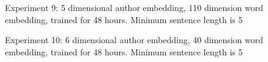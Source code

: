 \documentclass{article}%
\begin{document}
\begin{figure}
\noindent{}
\caption{Experiment 9: 5 dimensional author embedding, 110 dimension word embedding, trained for 48 hours. Minimum sentence length is 5}
\end{figure}
\begin{figure}
\noindent{}
\caption{Experiment 10: 6 dimensional author embedding, 40 dimension word embedding, trained for 48 hours. Minimum sentence length is 5}
\end{figure}
\end{document}
